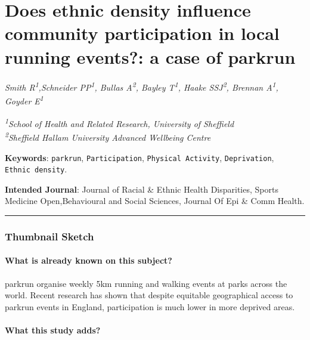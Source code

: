 \documentclass[]{article}
\title{}
\author{}
\date{}
\let\oldparagraph\paragraph
\renewcommand{\paragraph}[1]{\oldparagraph{#1}\mbox{}}
\begin{document}
\hypertarget{does-ethnic-density-influence-community-participation-in-local-running-events-a-case-of-parkrun}{%
\section{Does ethnic density influence community participation in local
running events?: a case of
parkrun}\label{does-ethnic-density-influence-community-participation-in-local-running-events-a-case-of-parkrun}}

\emph{Smith R\textsuperscript{1},Schneider PP\textsuperscript{1}, Bullas
A\textsuperscript{2}, Bayley T\textsuperscript{1}, Haake
SSJ\textsuperscript{2}, Brennan A\textsuperscript{1}, Goyder
E\textsuperscript{1}}

\begingroup\small

\emph{\textsuperscript{1}School of Health and Related Research,
University of Sheffield}\\
\emph{\textsuperscript{2}Sheffield Hallam University Advanced Wellbeing
Centre} \endgroup

\textbf{Keywords}: \texttt{parkrun}, \texttt{Participation},
\texttt{Physical\ Activity}, \texttt{Deprivation},
\texttt{Ethnic\ density}.

\textbf{Intended Journal}: Journal of Racial \& Ethnic Health
Disparities, Sports Medicine Open,Behavioural and Social Sciences,
Journal Of Epi \& Comm Health.

\begin{center}\rule{0.5\linewidth}{\linethickness}\end{center}

\hypertarget{thumbnail-sketch}{%
\subsubsection{Thumbnail Sketch}\label{thumbnail-sketch}}

\hypertarget{what-is-already-known-on-this-subject}{%
\paragraph{What is already known on this
subject?}\label{what-is-already-known-on-this-subject}}

parkrun organise weekly 5km running and walking events at parks across
the world. Recent research has shown that despite equitable geographical
access to parkrun events in England, participation is much lower in more
deprived areas.

\hypertarget{what-this-study-adds}{%
\paragraph{What this study adds?}\label{what-this-study-adds}}
\end{document}
